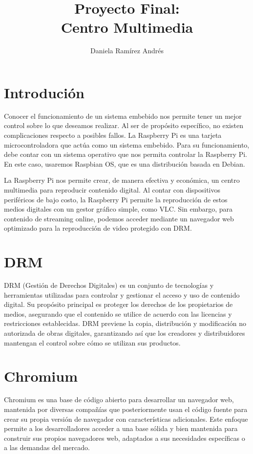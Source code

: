 \documentclass[report,12pt]{article}
\title{Proyecto Final: \\ Centro Multimedia}
\author{Daniela Ramírez Andrés}
\date{}
\begin{document}
	\maketitle
	\vspace{-6\baselineskip} %
	\section{Introdución}
	Conocer el funcionamiento de un sistema embebido nos permite tener un mejor control sobre lo que deseamos realizar. Al ser de propósito específico, no existen complicaciones respecto a posibles fallos. La Raspberry Pi es una tarjeta microcontroladora que actúa como un sistema embebido. Para su funcionamiento, debe contar con un sistema operativo que nos permita controlar la Raspberry Pi. En este caso, usaremos Raspbian OS, que es una distribución basada en Debian. \cite{calderon2014tutoria}
	
	La Raspberry Pi nos permite crear, de manera efectiva y económica, un centro multimedia para reproducir contenido digital. Al contar con dispositivos periféricos de bajo costo, la Raspberry Pi permite la reproducción de estos medios digitales con un gestor gráfico simple, como VLC. Sin embargo, para contenido de streaming online, podemos acceder mediante un navegador web optimizado para la reproducción de video protegido con DRM.
	 \cite{gonzález2015raspberrypi}
	
	
	\section{DRM}
	DRM (Gestión de Derechos Digitales) es un conjunto de tecnologías y herramientas utilizadas para controlar y gestionar el acceso y uso de contenido digital. Su propósito principal es proteger los derechos de los propietarios de medios, asegurando que el contenido se utilice de acuerdo con las licencias y restricciones establecidas. DRM previene la copia, distribución y modificación no autorizada de obras digitales, garantizando así que los creadores y distribuidores mantengan el control sobre cómo se utilizan sus productos.\cite{subodh2023drm}
	
	\section{Chromium}
	Chromium es una base de código abierto para desarrollar un navegador web, mantenida por diversas compañías que posteriormente usan el código fuente para crear su propia versión de navegador con características adicionales. Este enfoque permite a los desarrolladores acceder a una base sólida y bien mantenida para construir sus propios navegadores web, adaptados a sus necesidades específicas o a las demandas del mercado.
	
\end{document}
